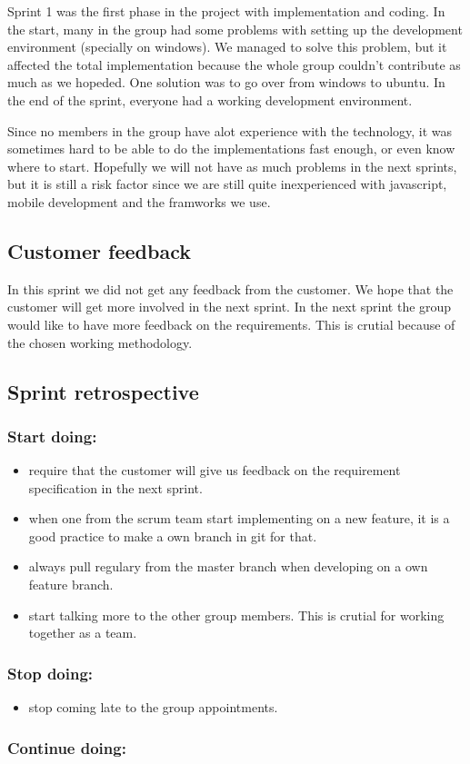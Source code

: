 	Sprint 1 was the first phase in the project with implementation and coding. In the start, 
	many in the group had
	some problems with setting up the development environment (specially on windows). We managed
	to solve this problem, but it affected the total implementation because the whole group couldn't 
	contribute as much as we hopeded. One solution was to go over from windows to ubuntu. 
	In the end of the sprint, everyone had a working development environment.

	Since no members in the group have alot experience with the technology, it was sometimes hard
	to be able to do the implementations fast enough, or even know where to start. 
	Hopefully we will not have as much problems in the next sprints, but it is still a risk factor 
	since we are still quite inexperienced with javascript, mobile development and the framworks we use. 

\subsection{Customer feedback}
	In this sprint we did not get any feedback from the customer. We hope that the customer
	will get more involved in the next sprint. In the next sprint the group would like to have
	more feedback on the requirements. This is crutial because of the chosen working 
	methodology.

\subsection{Sprint retrospective}
	\subsubsection*{Start doing: } 
		\begin{itemize}
			\item require that the customer will give us feedback on the
			requirement specification in the next sprint.
			\item when one from the scrum team start implementing on a new feature, 
			it is a good practice to make a own branch in git for that. 
			\item always pull regulary from the master branch when developing
			on a own feature branch.
			\item start talking more to the other group members. This is crutial 
			for working together as a team.
		\end{itemize}
	\subsubsection*{Stop doing: } 
		\begin{itemize}
			\item stop coming late to the group appointments.
		\end{itemize}
	\subsubsection*{Continue doing: } 
